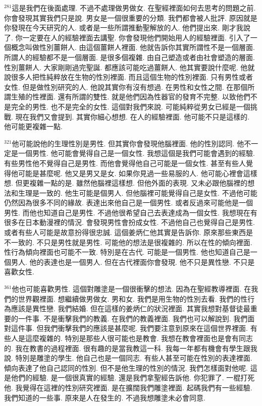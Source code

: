\documentclass{book}
\begin{document}
$^{281}$這是我們在後面處理.
不過不處理做男做女.
在聖經裡面如何去思考的問題之前.
你會發現其實我們只是說.
男女是一個很重要的分類.
我們都會被人批評.
原因就是你發現在今天研究的人.
或者是一些所謂推動聖解放的人.
他們提出來.
剛才我說了.
你一定要在人的經驗裡面去講聖.
你會發現他們開始用人的經驗裡面.
引入了一個概念叫做性別薑餅人.
由這個薑餅人裡面.
他就告訴你其實所謂性不是一個層面.
所謂人的經驗都不是一個層面.
是很多個複雜.
由自己塑造或者由社會塑造的層面.
性別薑餅人.
大家剛剛過完聖誕.
都應該可能吃過薑餅人.
他其實要說什麼呢.
他就說很多人把性純粹放在生物的性別裡面.
而且這個生物的性別裡面.
只有男性或者女性.
但是做性別研究的人.
他說其實你有沒有想過.
在男性和女性之間.
在那個所謂生殖的性裡面.
還有所謂的雙性.
就是他們因為性器官的發育不完整.
以致他們不是完全的男性.
也不是完全的女性.
這個對我們來說.
可能純粹從男女已經是一個挑戰.
現在我們又會提到.
其實你細心想想.
在人的經驗裡面.
他可能不只是這樣的.
他可能更複雜一點.

$^{321}$他可能說他的生理性別是男性.
但其實你會發現他腦裡面.
他的性別認同.
他不一定是一個男性.
他可能會覺得自己是一個女性.
我想這個是我們可能會遇到的經驗.
有些男性他不覺得自己是男性.
而他會覺得他自己可能是一個女性.
甚至有些人覺得他可能是甚麼呢.
他又是男又是女.
如果你見過一些易服的人.
他可能心裡會這樣想.
但更複雜一點的是.
雖然他腦裡這樣想.
但他外面的表現.
又未必跟他腦裡的想法和生理是一致的.
他生可能是個男人.
但他腦裡可能覺得自己是女性.
不過他可能仍然因為很多不同的緣故.
表達出來他自己是一個男性.
或者反過來可能他是一個男性.
而他也知道自己是男性.
不過他很希望自己去表達成為一個女性.
我想現在有很多在日本動漫裡的情況.
會發現男性會扮成女性.
不過他自己也覺得自己是男性.
或者有些人可能是故意扮得很忠誠.
這個姜炳仁他其實是告訴你.
原來那些東西是不一致的.
不只是男性就是男性.
可能他的想法是很複雜的.
所以在性的傾向裡面.
性行為傾向裡面也可能不一致.
特別是在古代.
可能是一個男性.
他也知道自己是一個男人.
他的表達也是一個男人.
但在古代裡面你會發現.
他不只是異性戀.
不只是喜歡女性.

$^{361}$他也可能喜歡男性.
這個對雕塗是一個很衝擊的想法.
因為在聖經教導裡面.
在我們的世界觀裡面.
想繼續做男做女.
男和女.
我們是用生物的性別去看.
我們的性行為應該是異性戀.
我們結婚.
但在這樣的姜炳仁的狀況裡面.
其實我想對基督徒最重要的一件事.
不是衝擊我們的教義.
在我們的教義裡面.
我們也可以解說到.
我們面對這件事.
但我們衝擊我們的應該是甚麼呢.
我們要注意到原來在這個世界裡面.
有些人是這麼複雜的.
特別是那些人很可能也是教會.
我想在教會裡面也是會有同志的.
我在教書的過程裡面.
很有趣的是當我教這一科.
我每一年都有機會有學生跟我說.
特別是雕塗的學生.
他自己也是一個同志.
有些人甚至可能在性別的表達裡面.
傾向表達了他自己認同的性別.
但不是他生理的性別的情況.
我們怎樣面對他呢.
這是他們的經驗.
是一個很真實的經驗.
還是我們拿聖經告訴他.
你犯罪了.
一棍打死他.
我覺得在這裡的性別研究裡面.
是在擴闊我們雕塗裡面.
起碼我們有一些經驗.
我們知道的一些事.
原來是人在發生的.
不過我想雕塗未必會同意.
\end{document}
